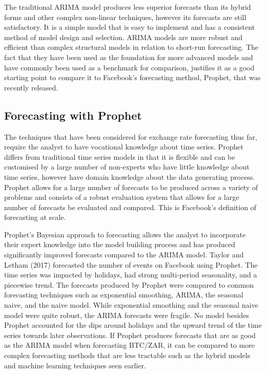 \documentclass[12pt,a4paper]{article}
\numberwithin{equation}{section}
\numberwithin{figure}{section}
\numberwithin{table}{section}
\begin{document}
The traditional ARIMA model produces less superior forecasts than its
hybrid forms and other complex non-linear techniques, however its
forecasts are still satisfactory. It is a simple model that is easy to
implement and has a consistent method of model design and selection.
ARIMA models are more robust and efficient than complex structural
models in relation to short-run forecasting. The fact that they have
been used as the foundation for more advanced models and have commonly
been used as a benchmark for comparison, justifies it as a good starting
point to compare it to Facebook's forecasting method, Prophet, that was
recently released.

\subsection{Forecasting with Prophet}\label{forecasting-with-prophet}

The techniques that have been considered for exchange rate forecasting
thus far, require the analyst to have vocational knowledge about time
series. Prophet differs from traditional time series models in that it
is flexible and can be customised by a large number of non-experts who
have little knowledge about time series, however have domain knowledge
about the data generating process. Prophet allows for a large number of
forecasts to be produced across a variety of problems and consists of a
robust evaluation system that allows for a large number of forecasts be
evaluated and compared. This is Facebook's definition of forecasting at
scale.

Prophet's Bayesian approach to forecasting allows the analyst to
incorporate their expert knowledge into the model building process and
has produced significantly improved forecasts compared to the ARIMA
model. Taylor and Letham (2017) forecasted the number of events on
Facebook using Prophet. The time series was impacted by holidays, had
strong multi-period seasonality, and a piecewise trend. The forecasts
produced by Prophet were compared to common forecasting techniques such
as exponential smoothing, ARIMA, the seasonal naive, and the naive
model. While exponential smoothing and the seasonal naive model were
quite robust, the ARIMA forecasts were fragile. No model besides Prophet
accounted for the dips around holidays and the upward trend of the time
series towards later observations. If Prophet produces forecasts that
are as good as the ARIMA model when forecasting BTC/ZAR, it can be
compared to more complex forecasting methods that are less tractable
such as the hybrid models and machine learning techniques seen earlier.
\end{document}
